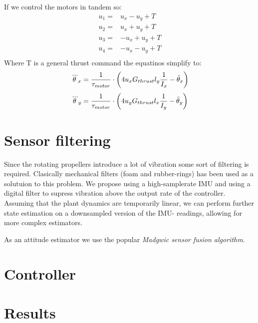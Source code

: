 If we control the motors in tandem so:
\begin{align*}
u_1 = & u_x - u_y + T\\
u_2 = & u_x + u_y + T\\
u_3 = & -u_x + u_y + T\\
u_4 = & -u_x - u_y + T\\
\end{align*}
Where T is a general thrust command the equatinos simplify to:
\begin{equation}
 \dddot\theta_x = \frac{1}{\tau_{motor}} \cdot \left(
 4 u_x G_{thrust} l_{y} \frac{ 1 }{ I_{x} }  - \ddot\theta_x
 \right) 
\end{equation}
\begin{equation}
 \dddot\theta_y = \frac{1}{\tau_{motor}} \cdot \left(
4 u_y G_{thrust} l_{x} \frac{ 1 }{ I_{y} }  - \ddot\theta_y
 \right) 
\end{equation}


\section{ Sensor filtering } %
Since the rotating propellers introduce a lot of vibration some sort of
filtering is required. Clasically mechanical filters (foam and rubber-rings) has
been used as a solutuion to this problem. We propose using a high-samplerate
IMU and using a digital filter to supress vibration above the output rate of the
controller. Assuming that the plant dynamics are temporarily linear, we can
perform further state estimation on a downsampled version of the IMU- readings,
allowing for more complex estimators.

As an attitude estimator we use the popular \emph{Madgwic sensor fusion
algorithm}.

\section{ Controller } %

\section{ Results } %



%
%






